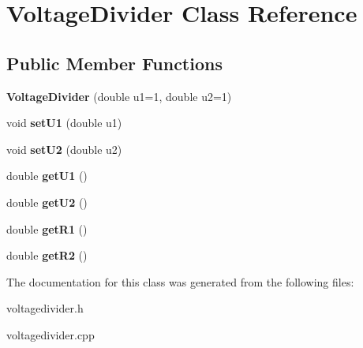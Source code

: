 \hypertarget{classVoltageDivider}{}\section{Voltage\+Divider Class Reference}
\label{classVoltageDivider}
\subsection*{Public Member Functions}
\begin{DoxyCompactItemize}
\item 
\mbox{\label{classVoltageDivider_a7e71609cdfe3faa54ddfde5c7634a92c}} 
{\bfseries Voltage\+Divider} (double u1=1, double u2=1)
\item 
\mbox{\label{classVoltageDivider_aecff4be4ac8dbe9dbee07f57a15cc370}} 
void {\bfseries set\+U1} (double u1)
\item 
\mbox{\label{classVoltageDivider_a52270fd71980ed94bc64e7a6f65a9e5c}} 
void {\bfseries set\+U2} (double u2)
\item 
\mbox{\label{classVoltageDivider_a36ab249dd0f1e5cb7b055affd249af6c}} 
double {\bfseries get\+U1} ()
\item 
\mbox{\label{classVoltageDivider_aee0957fabf473c72488e3d5fa7316bcd}} 
double {\bfseries get\+U2} ()
\item 
\mbox{\label{classVoltageDivider_ac9928564fe59e40e12346222a7eb82a2}} 
double {\bfseries get\+R1} ()
\item 
\mbox{\label{classVoltageDivider_aa83138c075ea0b37a20d65e4d7cc068b}} 
double {\bfseries get\+R2} ()
\end{DoxyCompactItemize}


The documentation for this class was generated from the following files\+:\begin{DoxyCompactItemize}
\item 
voltagedivider.\+h\item 
voltagedivider.\+cpp\end{DoxyCompactItemize}
